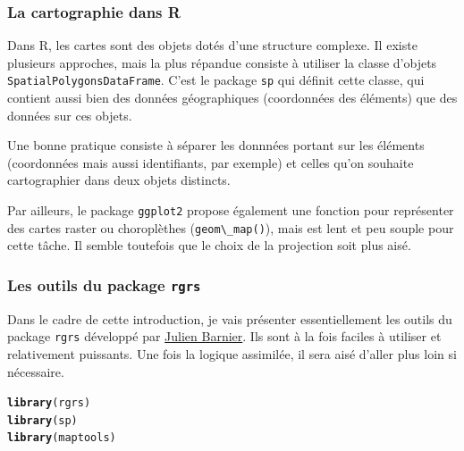 \documentclass[slidetop, 10pt]{beamer}\usepackage{graphicx, color}
\makeatletter
\newcommand{\hlfunctioncall}[1]{\textcolor[rgb]{0.501960784313725,0,0.329411764705882}{\textbf{#1}}}%
\newenvironment{kframe}{%
 \def\at@end@of@kframe{}%
 \ifinner\ifhmode%
  \def\at@end@of@kframe{\end{minipage}}%
  \begin{minipage}{\columnwidth}%
 \fi\fi%
 \def\FrameCommand##1{\hskip\@totalleftmargin \hskip-\fboxsep
 \colorbox{shadecolor}{##1}\hskip-\fboxsep
     \hskip-\linewidth \hskip-\@totalleftmargin \hskip\columnwidth}%
 \MakeFramed {\advance\hsize-\width
   \@totalleftmargin\z@ \linewidth\hsize
   \@setminipage}}%
 {\par\unskip\endMakeFramed%
 \at@end@of@kframe}
\newenvironment{knitrout}{}{} %
\renewenvironment{knitrout}{\begin{tiny}}{\end{tiny}}
\makeatother
\begin{document}
\begin{frame}
\frametitle{La cartographie dans R}

Dans R, les cartes sont des objets dotés d'une structure complexe. Il existe plusieurs approches, mais la plus répandue consiste à utiliser la classe d'objets \verb!SpatialPolygonsDataFrame!. C'est le package \verb!sp! qui définit cette classe, qui contient aussi bien des données géographiques (coordonnées des éléments) que des données sur ces objets.

Une bonne pratique consiste à séparer les donnnées portant sur les éléments (coordonnées mais aussi identifiants, par exemple) et celles qu'on souhaite cartographier dans deux objets distincts.

Par ailleurs, le package \verb!ggplot2! propose également une fonction pour représenter des cartes raster ou choroplèthes (\verb!geom\_map()!), mais est lent et peu souple pour cette tâche. Il semble toutefois que le choix de la projection soit plus aisé.

\end{frame}

\begin{frame}
\frametitle{Les outils du package \verb!rgrs!}
Dans le cadre de cette introduction, je vais présenter essentiellement les outils du package \verb!rgrs! développé par \href{http://alea.fr.eu.org/}{Julien Barnier}. Ils sont à la fois faciles à utiliser et relativement puissants. Une fois la logique assimilée, il sera aisé d'aller plus loin si nécessaire.

\begin{knitrout}\tiny
{}\color{fgcolor}\begin{kframe}
\begin{alltt}
\hlfunctioncall{library}(rgrs)
\hlfunctioncall{library}(sp)
\hlfunctioncall{library}(maptools)
\end{alltt}
\end{kframe}
\end{knitrout}


\end{frame}
\end{document}
